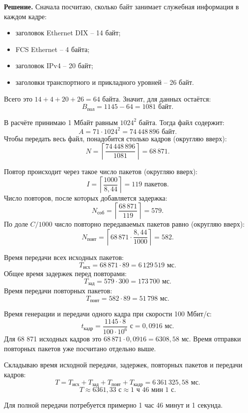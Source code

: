 \documentclass[a4paper, final]{article}
\begin{document}
\textbf{Решение.} Сначала посчитаю, сколько байт занимает служебная информация в каждом кадре:
\begin{itemize}
    \item заголовок Ethernet DIX -- 14 байт;
    \item FCS Ethernet -- 4 байта;
    \item заголовок IPv4 -- 20 байт;
    \item заголовки транспортного и прикладного уровней -- 26 байт.
\end{itemize}
Всего это $14+4+20+26=64$ байта. Значит, для данных остаётся:
\[
B_{\text{пол}}=1145-64=1081\text{ байт}.
\]

В расчёте принимаю 1 Мбайт равным $1024^2$ байта. Тогда файл содержит:
\[
A=71\cdot1024^2=74\,448\,896\text{ байт}.
\]
Чтобы передать весь файл, понадобится столько кадров (округляю вверх):
\[
N=\left\lceil\frac{74\,448\,896}{1081}\right\rceil=68\,871.
\]

Повтор происходит через такое число пакетов (округляю вверх):
\[
I=\left\lceil\frac{1000}{8{,}44}\right\rceil=119\text{ пакетов}.
\]
Число повторов, после которых добавляется задержка:
\[
N_{\text{соб}}=\left\lceil\frac{68\,871}{119}\right\rceil=579.
\]
По доле $C/1000$ число повторно передаваемых пакетов равно (округляю вверх):
\[
N_{\text{повт}}=\left\lceil68\,871\cdot\frac{8{,}44}{1000}\right\rceil=582.
\]

Время передачи всех исходных пакетов:
\[
T_{\text{исх}}=68\,871\cdot89=6\,129\,519\text{ мс}.
\]
Общее время задержек перед повторами:
\[
T_{\text{зад}}=579\cdot300=173\,700\text{ мс}.
\]
Время передачи повторных пакетов:
\[
T_{\text{повт}}=582\cdot89=51\,798\text{ мс}.
\]

Время генерации и передачи одного кадра при скорости 100 Мбит/с:
\[
t_{\text{кадр}}=\frac{1145\cdot8}{100\cdot10^6}\text{ с}=0{,}0916\text{ мс}.
\]
Для 68 871 исходных кадров это $68\,871\cdot0{,}0916=6308{,}58$ мс. Время отправки повторных пакетов уже посчитано отдельно выше.

Складываю время исходной передачи, задержек, повторных пакетов и передачи кадров:
\[
T=T_{\text{исх}}+T_{\text{зад}}+T_{\text{повт}}+T_{\text{кадр}}
=6\,361\,325{,}58\text{ мс}.
\]
\[
T\approx6361{,}33\text{ с}\approx1\text{ ч }46\text{ мин }1\text{ с}.
\]

Для полной передачи потребуется примерно 1 час 46 минут и 1 секунда.
\end{document}
